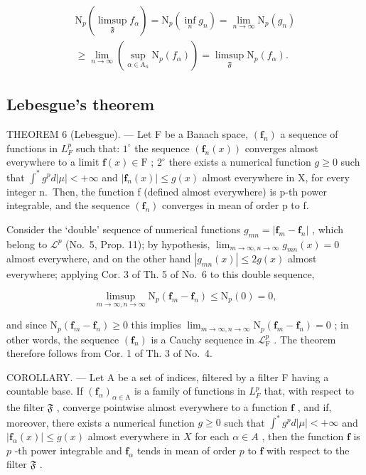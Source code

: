 \[
\begin{array}{l} \mathrm{N} _ {p} (\limsup _ {\mathfrak {F}} f _ {\alpha}) = \mathrm{N} _ {p} \left(\inf _ {n} g _ {n}\right) = \lim _ {n \to \infty} \mathrm{N} _ {p} (g _ {n}) \\ \geqslant \lim _ {n \to \infty} \left(\sup _ {\alpha \in \mathrm{A} _ {n}} \mathrm{N} _ {p} (f _ {\alpha})\right) = \limsup _ {\mathfrak {F}} \mathrm{N} _ {p} (f _ {\alpha}). \end{array}
\]

\subsection{Lebesgue's theorem}

THEOREM 6 (Lebesgue). --- Let F be a Banach space, \((\mathbf{f}_{n})\) a sequence of functions in \(L_{F}^{p}\) such that: \(1^{\circ}\) the sequence \((\mathbf{f}_{n}(x))\) converges almost everywhere to a limit \(\mathbf{f}(x) \in \mathrm{F}\) ; \(2^{\circ}\) there exists a numerical function \(g \geqslant 0\) such that \(\int^{*} g^{p} d|\mu| < +\infty\) and \(|\mathbf{f}_{n}(x)| \leqslant g(x)\) almost everywhere in X, for every integer n.~Then, the function f (defined almost everywhere) is p-th power integrable, and the sequence \((\mathbf{f}_{n})\) converges in mean of order p to f.

Consider the `double' sequence of numerical functions \(g_{mn} = |\mathbf{f}_m - \mathbf{f}_n|\) , which belong to \(\mathcal{L}^p\) (No.~5, Prop. 11); by hypothesis, \(\lim_{m\to \infty, n\to \infty}g_{mn}(x) = 0\) almost everywhere, and on the other hand \(|g_{mn}(x)|\leqslant 2g(x)\) almost everywhere; applying Cor. 3 of Th. 5 of No.~6 to this double sequence,

\[
\limsup _ {m \to \infty ,   n \to \infty} \mathrm{N} _ {p} (\mathbf {f} _ {m} - \mathbf {f} _ {n}) \leqslant \mathrm{N} _ {p} (0) = 0  ,
\]

and since \(\mathrm{N}_p(\mathbf{f}_m - \mathbf{f}_n) \geqslant 0\) this implies \(\lim_{m \to \infty, n \to \infty} \mathrm{N}_p(\mathbf{f}_m - \mathbf{f}_n) = 0\) ; in other words, the sequence \((\mathbf{f}_n)\) is a Cauchy sequence in \(\mathcal{L}_{\mathrm{F}}^p\) . The theorem therefore follows from Cor. 1 of Th. 3 of No.~4.

COROLLARY. --- Let A be a set of indices, filtered by a filter F having a countable base. If \((\mathbf{f}_{\alpha})_{\alpha \in \mathrm{A}}\) is a family of functions in \(L_{F}^{p}\) that, with respect to the filter \(\mathfrak{F}\) , converge pointwise almost everywhere to a function \(\mathbf{f}\) , and if, moreover, there exists a numerical function \(g \geqslant 0\) such that \(\int^{*} g^{p} d|\mu| < +\infty\) and \(|\mathbf{f}_{\alpha}(x)| \leqslant g(x)\) almost everywhere in \(X\) for each \(\alpha \in A\) , then the function \(\mathbf{f}\) is \(p\) -th power integrable and \(\mathbf{f}_{\alpha}\) tends in mean of order \(p\) to \(\mathbf{f}\) with respect to the filter \(\mathfrak{F}\) .

